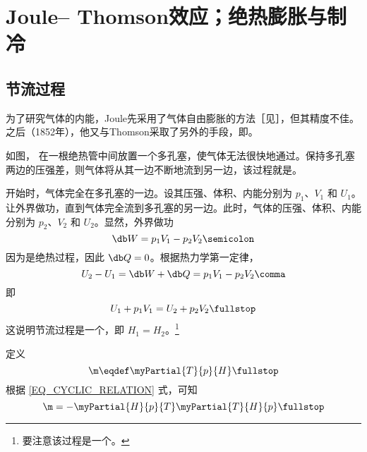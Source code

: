\section{\texorpdfstring{Joule--\!\! Thomson}{Joule--Thomson}效应；绝热膨胀与制冷}%
	\subsection{节流过程}
		为了研究气体的内能，Joule先采用了气体自由膨胀的方法［见］，但其精度不佳。之后（1852年），他又与Thomson采取了另外的手段，即。
		
		如图，%
		在一根绝热管中间放置一个多孔塞，使气体无法很快地通过。保持多孔塞两边的压强差，则气体将从其一边不断地流到另一边，该过程就是。
		
		开始时，气体完全在多孔塞的一边。设其压强、体积、内能分别为 $p_1$、$V_1$ 和 $U_1$。让外界做功，直到气体完全流到多孔塞的另一边。此时，气体的压强、体积、内能分别为 $p_2$、$V_2$ 和 $U_2$。显然，外界做功
		\begin{equation}
			\db W = p_1 V_1 - p_2 V_2 \semicolon
		\end{equation}
		因为是绝热过程，因此 $\db Q = 0$。根据热力学第一定律，
		\begin{equation}
			U_2 - U_1 = \db W + \db Q = p_1 V_1 - p_2 V_2 \comma
		\end{equation}
		即
		\begin{equation}
			U_1 + p_1 V_1 = U_2 + p_2 V_2 \fullstop
		\end{equation}
		这说明节流过程是一个，即 $H_1 = H_2$。\footnote{
			要注意该过程是一个。
		}
		
		定义
		\begin{equation}
			\m \eqdef \myPartial{T}{p}{H} \fullstop
		\end{equation}
		根据 \eqref{EQ_CYCLIC_RELATION} 式，可知
		\begin{equation}
			\m = -\myPartial{H}{p}{T} \myPartial{T}{H}{p} \fullstop
		\end{equation}
		
